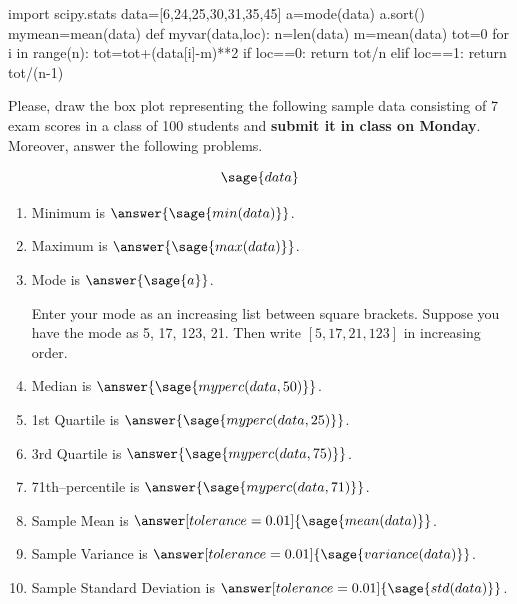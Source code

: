 \documentclass{ximera}
\begin{document}
\begin{problem}
\begin{sagesilent}
import scipy.stats
data=[6,24,25,30,31,35,45]
a=mode(data)
a.sort()
mymean=mean(data)
def myvar(data,loc):
    n=len(data)
    m=mean(data)
    tot=0
    for i in range(n):
        tot=tot+(data[i]-m)**2
    if loc==0:
        return tot/n
    elif loc==1:
        return tot/(n-1)
    
    
\end{sagesilent}
Please, draw the box plot representing the following sample data consisting of 7 exam scores in a class of 100 students and \textbf{submit it in class on Monday}. Moreover, answer the following problems.

$$\sage{data}$$

\begin{enumerate}
    \item Minimum is $\answer{\sage{min(data)}}$.
    \item Maximum is $\answer{\sage{max(data)}}$.
    \item Mode is $\answer{\sage{a}}$.
        \begin{hint}
        Enter your mode as an increasing list between square brackets. 
        Suppose you have the mode as 5, 17, 123, 21. Then write $[5, 17,21, 123]$ in increasing order.
        \end{hint}
    \item Median is $\answer{\sage{myperc(data,50)}}$.
    \item 1st Quartile is $\answer{\sage{myperc(data,25)}}$.
    \item 3rd Quartile is $\answer{\sage{myperc(data,75)}}$.
    \item 71th--percentile is $\answer{\sage{myperc(data,71)}}$.
    \item Sample Mean is $\answer[tolerance=0.01]{\sage{mean(data)}}$.
    \item Sample Variance is $\answer[tolerance=0.01]{\sage{variance(data)}}$.
    \item Sample Standard Deviation is $\answer[tolerance=0.01]{\sage{std(data)}}$.
\end{enumerate}
\end{problem}
\end{document}
